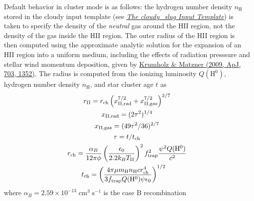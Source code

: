 \documentclass[letterpaper,10pt,english]{sphinxmanual}
\begin{document}
Default behavior in cluster mode is as follows:
the hydrogen number density \(n_{\mathrm{H}}\)
stored in the cloudy input template (see {\hyperref[cloudy:ssec-cloudy-template]{\emph{The cloudy\_slug Input Template}}})
is taken to specify the density of the \emph{neutral} gas around the HII
region, not the density of the gas inside the HII region. The outer
radius of the HII region is then computed using the approximate
analytic solution for the expansion of an HII region into a uniform
medium, including the effects of radiation presssure and stellar wind
momentum deposition, given by \href{http://adsabs.harvard.edu/abs/2009ApJ...703.1352K}{Krumholz \& Matzner (2009, ApJ,
703, 1352)}. The
radius is computed from the ionizing luminosity
\(Q(\mathrm{H}^0)\), hydrogen number density
\(n_{\mathrm{H}}\), and star cluster age \(t\) as
\begin{gather}
\begin{split}r_{\mathrm{II}} & = r_{\mathrm{ch}}
\left(x_{\mathrm{II,rad}}^{7/2} +
x_{\mathrm{II,gas}}^{7/2}\right)^{2/7} \\\end{split}\notag\\\begin{split}x_{\mathrm{II,rad}} &= (2\tau^2)^{1/4} \\\end{split}\notag\\\begin{split}x_{\mathrm{II,gas}} &= (49\tau^2/36)^{2/7} \\\end{split}\notag\\\begin{split}\tau &= t/t_{\mathrm{ch}} \\\end{split}\notag\\\begin{split}r_{\mathrm{ch}} & = \frac{\alpha_B}{12\pi\phi}
\left(\frac{\epsilon_0}{2.2 k_B T_{\mathrm{II}}}\right)^2
f_{\mathrm{trap}}^2 \frac{\psi^2 Q(\mathrm{H}^0)}{c^2} \\\end{split}\notag\\\begin{split}t_{\mathrm{ch}} & = \left(\frac{4\pi \mu m_{\mathrm{H}}
n_{\mathrm{H}} c r_{\mathrm{ch}}^4}{3 f_{\mathrm{trap}}
Q(\mathrm{H}^0) \psi \epsilon_0}\right)^{1/2}\end{split}\notag
\end{gather}
where \(\alpha_B = 2.59\times
10^{-13}\;\mathrm{cm}^3\;\mathrm{s}^{-1}\) is the case B recombination
\end{document}
